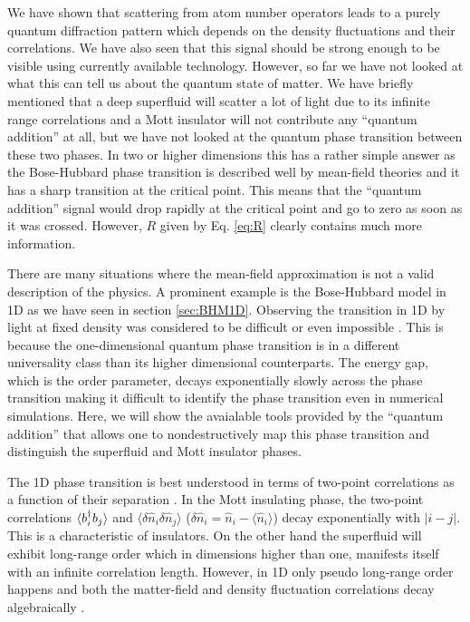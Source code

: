 We have shown that scattering from atom number operators leads to a
purely quantum diffraction pattern which depends on the density
fluctuations and their correlations. We have also seen that this
signal should be strong enough to be visible using currently available
technology. However, so far we have not looked at what this can tell
us about the quantum state of matter. We have briefly mentioned that a
deep superfluid will scatter a lot of light due to its infinite range
correlations and a Mott insulator will not contribute any ``quantum
addition'' at all, but we have not looked at the quantum phase
transition between these two phases. In two or higher dimensions this
has a rather simple answer as the Bose-Hubbard phase transition is
described well by mean-field theories and it has a sharp transition at
the critical point. This means that the ``quantum addition'' signal
would drop rapidly at the critical point and go to zero as soon as it
was crossed. However, $R$ given by Eq. \eqref{eq:R} clearly contains
much more information.

There are many situations where the mean-field approximation is not a
valid description of the physics. A prominent example is the
Bose-Hubbard model in 1D \cite{cazalilla2011, ejima2011, kuhner2000,
  pino2012, pino2013} as we have seen in section
\ref{sec:BHM1D}. Observing the transition in 1D by light at fixed
density was considered to be difficult \cite{rogers2014} or even
impossible \cite{roth2003}. This is because the one-dimensional
quantum phase transition is in a different universality class than its
higher dimensional counterparts. The energy gap, which is the order
parameter, decays exponentially slowly across the phase transition
making it difficult to identify the phase transition even in numerical
simulations. Here, we will show the avaialable tools provided by the
``quantum addition'' that allows one to nondestructively map this
phase transition and distinguish the superfluid and Mott insulator
phases.

The 1D phase transition is best understood in terms of two-point
correlations as a function of their separation \cite{giamarchi}. In
the Mott insulating phase, the two-point correlations $\langle b^\dagger_i
b_j \rangle$ and $\langle \delta \hat{n}_i \delta \hat{n}_j \rangle$
($\delta \hat{n}_i =\hat{n}_i-\langle \hat{n}_i\rangle$) decay
exponentially with $|i-j|$. This is a characteristic of insulators. On
the other hand the superfluid will exhibit long-range order which in
dimensions higher than one, manifests itself with an infinite
correlation length. However, in 1D only pseudo long-range order
happens and both the matter-field and density fluctuation correlations
decay algebraically \cite{giamarchi}.


